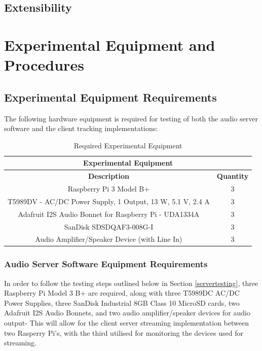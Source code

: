 \documentclass[11pt,a4paper,headinclude=false,footinclude=false]{scrreprt}
\begin{document}
\section{Extensibility}\label{extensibility}

\chapter{Experimental Equipment and
Procedures}\label{experimental-equipment-and-procedures}

\section{Experimental Equipment
Requirements}\label{experimental-equipment-requirements}

The following hardware equipment is required for testing of both the
audio server software and the client tracking implementations:

\begin{table}[H]
\centering
    \begin{tabular}{||c|c||}
    \hline
    \multicolumn{2}{|c|}{\textbf{Experimental Equipment}} \\
    \hline\hline
    \textbf{Description} & \textbf{Quantity} \\
    \hline\hline
    Raspberry Pi 3 Model B+ & 3 \\
    \hline
    T5989DV - AC/DC Power Supply, 1 Output, 13 W, 5.1 V, 2.4 A & 3 \\
    \hline
    Adafruit I2S Audio Bonnet for Raspberry Pi - UDA1334A & 3 \\
    \hline
    SanDisk SDSDQAF3-008G-I & 3 \\
    \hline
    Audio Amplifier/Speaker Device (with Line In) & 3 \\
    \hline
    \end{tabular}
    \caption{Required Experimental Equipment}
    \label{ExperimentalEquip}
\end{table}

\subsection{Audio Server Software Equipment
Requirements}\label{audio-server-software-equipment-requirements}

In order to follow the testing steps outlined below in Section
\ref{servertesting}, three Raspberry Pi Model 3 B+ are required, along
with three T5989DC AC/DC Power Supplies, three SanDisk Industrial 8GB
Class 10 MicroSD cards, two Adafruit I2S Audio Bonnets, and two audio
amplifier/speaker devices for audio output- This will allow for the
client server streaming implementation between two Rasperry Pi's, with
the third utilised for monitoring the devices used for streaming.
\end{document}
